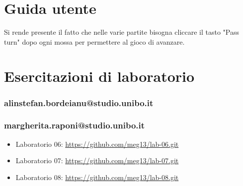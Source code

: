 \documentclass[a4paper,12pt]{report}
\begin{document}
\appendix

\chapter{Guida utente}

Si rende presente il fatto che nelle varie partite bisogna cliccare il tasto "Pass turn" dopo ogni mossa per permettere al gioco di avanzare.

\chapter{Esercitazioni di laboratorio}

\subsection{alinstefan.bordeianu@studio.unibo.it}

\subsection{margherita.raponi@studio.unibo.it}
\begin{itemize}
\item Laboratorio 06: \url{https://github.com/meg13/lab-06.git}
\item Laboratorio 07: \url{https://github.com/meg13/lab-07.git}
\item Laboratorio 08: \url{https://github.com/meg13/lab-08.git}
\end{itemize}
\end{document}
